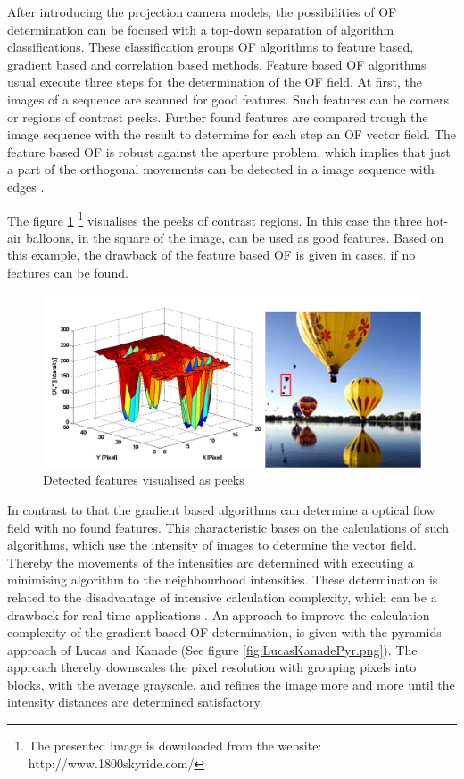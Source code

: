 After introducing the projection camera models, the possibilities of \gls{OF} determination can be focused
with a top-down separation of algorithm classifications. These classification groups \gls{OF} algorithms to feature based, 
gradient based and correlation based methods. Feature based \gls{OF} algorithms usual execute three steps for the determination of the \gls{OF} field. At first, the images of a sequence are scanned for good features. Such features can be corners or regions of contrast peeks. Further found features are compared trough the image sequence with the result to determine for each step an \gls{OF} vector field. 
\newpage
The feature based \gls{OF} is robust against the aperture problem, which implies that just a part of the orthogonal movements can be detected in a image sequence with edges . 

The figure \ref{fig:IntensitySample.png} 
\footnote{The presented image is downloaded from the website: http://www.1800skyride.com/} visualises the peeks of contrast regions. In this case the three hot-air balloons, in the square of the image, can be used as good features. Based on this example, the drawback of the feature based \gls{OF} is given in cases, if no features can be found.

\begin{figure}[!h]
	\centering
		\includegraphics[width=1\textwidth]{graphic/IntensitySample.png}
\caption{Detected features visualised as peeks}
	\label{fig:IntensitySample.png}
\end{figure}

In contrast to that the gradient based algorithms can determine a optical flow field with no found features. This characteristic bases on the calculations of such algorithms, which use the intensity of images to determine the vector field. Thereby the movements of the intensities are determined with executing a minimising algorithm to the neighbourhood intensities. These determination is related to the disadvantage of intensive calculation complexity, which can be a drawback for real-time applications  .
\newpage
An approach to improve the calculation complexity of the gradient based \gls{OF} determination, is given with the pyramids approach of Lucas and Kanade  (See figure \ref{fig:LucasKanadePyr.png}). The approach thereby downscales the pixel resolution with grouping pixels into blocks, with the average grayscale, and refines the image more and more until the intensity distances are determined satisfactory.

